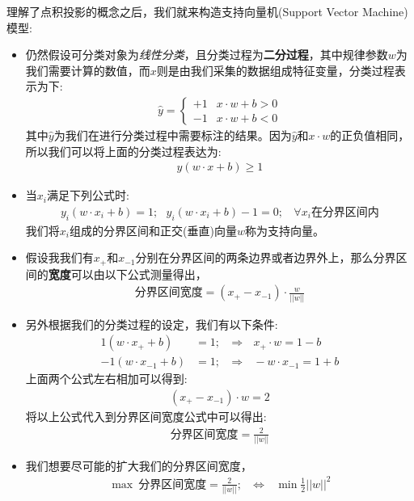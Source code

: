 \documentclass[12pt]{article}
\numberwithin{figure}{section}
\numberwithin{equation}{section}
\begin{document}
理解了点积投影的概念之后，我们就来构造支持向量机(Support Vector Machine)模型:
\begin{itemize}
	\item 仍然假设可分类对象为\textit{线性分类}，且分类过程为\textbf{二分过程}，其中规律参数$w$为我们需要计算的数值，而$x$则是由我们采集的数据组成特征变量，分类过程表示为下:
	\begin{align*}
		\hat{y} = \begin{cases}
			+1 & x \cdot w + b > 0 \\
			-1 & x \cdot w + b < 0 
		\end{cases}
	\end{align*}
	其中$\hat{y}$为我们在进行分类过程中需要标注的结果。因为$\hat{y}$和$x\cdot w$的正负值相同，所以我们可以将上面的分类过程表达为:
	\begin{align*}
		y(w \cdot x + b) \geq 1 
	\end{align*}
	\item 当$x_i$满足下列公式时:
	\begin{align*}
		y_i(w \cdot x_i + b) = 1; \ \ \ y_i(w \cdot x_i + b) - 1 = 0; \ \ \ \   \forall x_i \text{在分界区间内}
	\end{align*}
	我们将$x_i$组成的分界区间和正交(垂直)向量$w$称为支持向量。
	\item 假设我我们有$x_{+}$和$x_{-1}$分别在分界区间的两条边界或者边界外上，那么分界区间的\textbf{宽度}可以由以下公式测量得出，
	\begin{align*}
		\text{分界区间宽度} = (x_{+} - x_{-1}) \cdot \frac{w}{||w||}
	\end{align*}
	\item 另外根据我们的分类过程的设定，我们有以下条件: 
	\begin{align*}
		1(w \cdot x_{+} +b ) & = 1; \ \ \  \Rightarrow \ \ \  x_{+} \cdot w = 1 - b  \\
		-1(w \cdot x_{-1} + b) & = 1; \ \ \ \Rightarrow \ \ \ -w \cdot x_{-1} = 1 + b 
	\end{align*}
	上面两个公式左右相加可以得到:
	\begin{align*}
		(x_{+} - x_{-1} ) \cdot w = 2 
	\end{align*}
	将以上公式代入到分界区间宽度公式中可以得出:
	\begin{align*}
		\text{分界区间宽度} =  \frac{2}{||w||}
	\end{align*}
	\item 我们想要尽可能的扩大我们的分界区间宽度，
	\begin{align*}
		\max \ \text{分界区间宽度} =  \frac{2}{||w||}; \ \ \ \Leftrightarrow \ \ \ \min \frac{1}{2} ||w||^2
	\end{align*}
\end{itemize}
\end{document}
